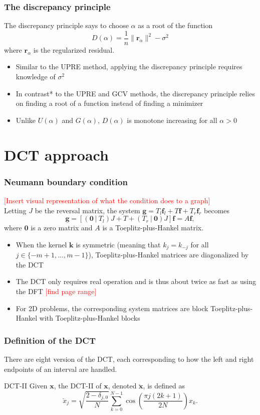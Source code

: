 \documentclass{beamer}
\newcommand{\ToDo}[1]{\textcolor{red}{[#1]}}
\newcommand{\noiseSD}{\sigma}	%
\newcommand{\gVec}{\mathbf{g}}	%
\newcommand{\kVec}{\mathbf{k}}	%
\newcommand{\fVec}{\mathbf{f}}	%
\newcommand{\dct}[1]{\breve{#1}}	%
\newcommand{\regparam}{\alpha}
\newcommand{\regres}{\mathbf{r}_{\regparam}}	%
\newcommand{\U}{U}	%
\newcommand{\GCV}{G}	%
\newcommand{\D}{D}	%
\begin{document}
\begin{frame}
\frametitle{The discrepancy principle}
The discrepancy principle \cite{Morozov1966} says to choose $\regparam$ as a root of the function
\[\D(\regparam) = \frac{1}{n}\|\regres\|^2 - \noiseSD^2\]
where $\regres$ is the regularized residual.
\begin{itemize}
\item Similar to the UPRE method, applying the discrepancy principle requires knowledge of $\noiseSD^2$
\item In contrast* to the UPRE and GCV methods, the discrepancy principle relies on finding a root of a function instead of finding a minimizer
\item Unlike $\U(\regparam)$ and $\GCV(\regparam)$, $\D(\regparam)$ is monotone increasing for all $\regparam > 0$
\end{itemize}
\end{frame}

\section{DCT approach}

\begin{frame}
\frametitle{Neumann boundary condition}
\ToDo{Insert visual representation of what the condition does to a graph} \\
Letting $J$ be the reversal matrix, the system $\gVec = T_{l}\fVec_{l} + T\fVec + T_{r}\fVec_{r}$ becomes
\[\gVec = [(\mathbf{0}~|~T_{l})J + T + (T_{r}~|~\mathbf{0})J]\fVec = A\fVec,\]
where $\mathbf{0}$ is a zero matrix and $A$ is a Toeplitz-plus-Hankel matrix.
\begin{itemize}
\item When the kernel $\kVec$ is symmetric (meaning that $k_j = k_{-j}$ for all $j \in \{-m+1,\ldots,m-1\}$), Toeplitz-plus-Hankel matrices are diagonalized by the DCT \cite{Martucci1994,NeumannDCT}
\item The DCT only requires real operation and is thus about twice as fast as using the DFT \cite{RaoYip2014} \ToDo{find page range}
\item For 2D problems, the corresponding system matrices are block Toeplitz-plus-Hankel with Toeplitz-plus-Hankel blocks
\end{itemize}
\end{frame}

\begin{frame}
\frametitle{Definition of the DCT}
There are eight version of the DCT, each corresponding to how the left and right endpoints of an interval are handled.
\begin{block}{DCT-II}
Given $\mathbf{x}$, the DCT-II of $\mathbf{x}$, denoted $\dct{\mathbf{x}}$, is defined as
\[\dct{x}_j = \sqrt{\frac{2 - \delta_{j,0}}{N}} \sum_{k=0}^{N-1} \cos\left(\frac{\pi{j}(2k + 1)}{2N}\right) x_k.\]
\end{block}
\end{frame}
\end{document}
